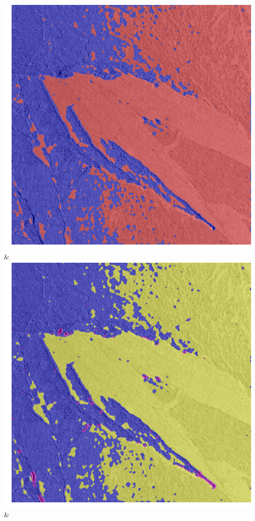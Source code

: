 \begin{table}[h!]
\begin{tabularx}{\textwidth}
		\includegraphics[width=0.9\linewidth]{images/gen/convolution_number/p03_03.png_3.png} &
		\includegraphics[width=0.9\linewidth]{images/gen/convolution_number/p03_03.png_4.png} &

\end{tabularx}
\end{table}
